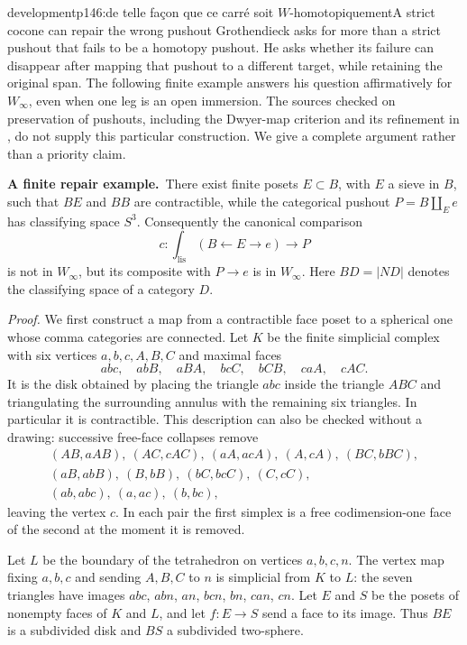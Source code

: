 \begin{dcomment}{development}{p146:de telle façon que ce carré soit $W$-homotopiquement}{A strict cocone can repair the wrong pushout}
Grothendieck asks for more than a strict pushout that fails to be a homotopy pushout. He asks whether its failure can disappear after mapping that pushout to a different target, while retaining the original span. The following finite example answers his question affirmatively for $W_\infty$, even when one leg is an open immersion. The sources checked on preservation of pushouts, including the Dwyer-map criterion and its refinement in \citet[Theorems~1.5--1.6, arXiv v3]{HackneyOzornovaRiehlRovelli2024}, do not supply this particular construction. We give a complete argument rather than a priority claim.

\textbf{A finite repair example.}\ours\
There exist finite posets $E\subset B$, with $E$ a sieve in $B$, such that $BE$ and $BB$ are contractible, while the categorical pushout $P=B\amalg_E e$ has classifying space $S^3$. Consequently the canonical comparison
\[
 c:\int_{\mathrm{lis}}(B\leftarrow E\to e)\longrightarrow P
\]
is not in $W_\infty$, but its composite with $P\to e$ is in $W_\infty$. Here $BD=|ND|$ denotes the classifying space of a category $D$.

\emph{Proof.} We first construct a map from a contractible face poset to a spherical one whose comma categories are connected. Let $K$ be the finite simplicial complex with six vertices $a,b,c,A,B,C$ and maximal faces
\[
 abc,\quad abB,\quad aBA,\quad bcC,\quad bCB,\quad caA,\quad cAC.
\]
It is the disk obtained by placing the triangle $abc$ inside the triangle $ABC$ and triangulating the surrounding annulus with the remaining six triangles. In particular it is contractible. This description can also be checked without a drawing: successive free-face collapses remove
\[
\begin{gathered}
(AB,aAB),\ (AC,cAC),\ (aA,acA),\ (A,cA),\ (BC,bBC),\\
(aB,abB),\ (B,bB),\ (bC,bcC),\ (C,cC),\\
(ab,abc),\ (a,ac),\ (b,bc),
\end{gathered}
\]
leaving the vertex $c$. In each pair the first simplex is a free codimension-one face of the second at the moment it is removed.

Let $L$ be the boundary of the tetrahedron on vertices $a,b,c,n$. The vertex map fixing $a,b,c$ and sending $A,B,C$ to $n$ is simplicial from $K$ to $L$: the seven triangles have images $abc$, $abn$, $an$, $bcn$, $bn$, $can$, $cn$. Let $E$ and $S$ be the posets of nonempty faces of $K$ and $L$, and let $f:E\to S$ send a face to its image. Thus $BE$ is a subdivided disk and $BS$ a subdivided two-sphere.


\end{dcomment}
